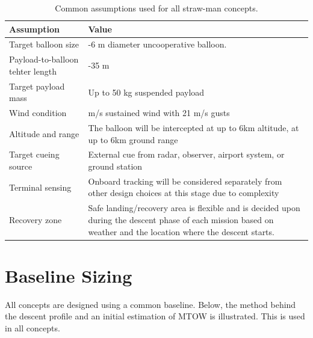 \begin{table}[H]
    \centering
    \caption{Common assumptions used for all straw-man concepts.}
    \label{tab:common_concept_assumptions}
    \begin{tabularx}{\textwidth}{@{}>{\raggedright\arraybackslash}p{} >{\raggedright\arraybackslash}X@{}}
        \toprule
        \textbf{Assumption} & \textbf{Value} \\
        \midrule

        Target balloon size 
        & 2-6 m diameter uncooperative balloon. \\

        Payload-to-balloon tehter length 
        & 2-35 m  \\ 

        Target payload mass 
        & Up to 50 kg suspended payload \\

        Wind condition 
        &  13 m/s sustained wind with 21 m/s gusts \\

        Altitude and range
        & The balloon will be intercepted at up to 6km altitude, at up to 6km ground range \\

        Target cueing source 
        & External cue from radar, observer, airport system, or ground station \\

        Terminal sensing 
        & Onboard tracking will be considered separately from other design choices at this stage due to complexity \\

        Recovery zone 
        & Safe landing/recovery area is flexible and is decided upon during the descent phase of each mission based on weather and the location where the descent starts. \\
        
        \bottomrule
    \end{tabularx}
\end{table}










\section{Baseline Sizing}

All concepts are designed using a common baseline. Below, the method behind the descent profile and an initial estimation of MTOW is illustrated. This is used in all concepts.
